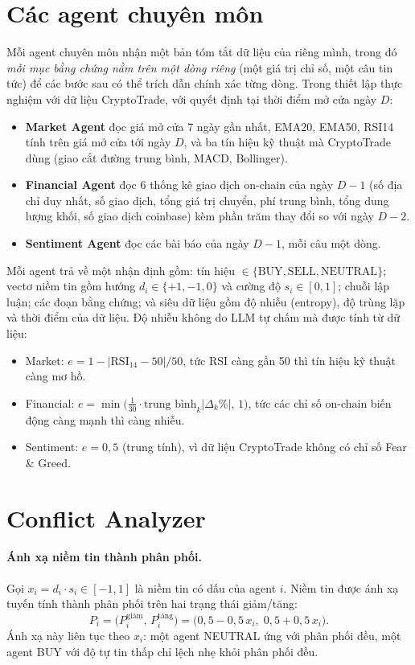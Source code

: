 \section{Các agent chuyên môn}
\label{sec:specialists}
Mỗi agent chuyên môn nhận một bản tóm tắt dữ liệu của riêng mình, trong đó \emph{mỗi mục bằng chứng nằm trên một dòng
riêng} (một giá trị chỉ số, một câu tin tức) để các bước sau có thể trích dẫn chính xác từng dòng. Trong thiết lập
thực nghiệm với dữ liệu CryptoTrade, với quyết định tại thời điểm mở cửa ngày $D$:
\begin{itemize}
  \item \textbf{Market Agent} đọc giá mở cửa 7 ngày gần nhất, EMA20, EMA50, RSI14 tính trên giá mở cửa tới ngày $D$, và
  ba tín hiệu kỹ thuật mà CryptoTrade dùng (giao cắt đường trung bình, MACD, Bollinger).
  \item \textbf{Financial Agent} đọc 6 thống kê giao dịch on-chain của ngày $D-1$ (số địa chỉ duy nhất, số giao dịch,
  tổng giá trị chuyển, phí trung bình, tổng dung lượng khối, số giao dịch coinbase) kèm phần trăm thay đổi so với ngày
  $D-2$.
  \item \textbf{Sentiment Agent} đọc các bài báo của ngày $D-1$, mỗi câu một dòng.
\end{itemize}

Mỗi agent trả về một nhận định gồm: tín hiệu $\in\{\text{BUY},\text{SELL},\text{NEUTRAL}\}$; vectơ niềm tin gồm hướng
$d_i\in\{+1,-1,0\}$ và cường độ $s_i\in[0,1]$; chuỗi lập luận; các đoạn bằng chứng; và siêu dữ liệu gồm độ nhiễu
(entropy), độ trùng lặp và thời điểm của dữ liệu. Độ nhiễu không do LLM tự chấm mà được tính từ dữ liệu:
\begin{itemize}
  \item Market: $e = 1 - |\text{RSI}_{14} - 50|/50$, tức RSI càng gần 50 thì tín hiệu kỹ thuật càng mơ hồ.
  \item Financial: $e = \min\!\big(\tfrac{1}{30}\cdot\text{trung bình}_k|\Delta_k\%|,\,1\big)$, tức các chỉ số on-chain biến
  động càng mạnh thì càng nhiễu.
  \item Sentiment: $e = 0{,}5$ (trung tính), vì dữ liệu CryptoTrade không có chỉ số Fear \& Greed.
\end{itemize}

\section{Conflict Analyzer}
\label{sec:conflict}
\paragraph{Ánh xạ niềm tin thành phân phối.} Gọi $x_i = d_i\cdot s_i\in[-1,1]$ là niềm tin có dấu của agent $i$.
Niềm tin được ánh xạ tuyến tính thành phân phối trên hai trạng thái giảm/tăng:
\begin{equation}
  P_i = \big(P_i^{\text{giảm}},\,P_i^{\text{tăng}}\big) = \big(0{,}5 - 0{,}5\,x_i,\;0{,}5 + 0{,}5\,x_i\big).
\end{equation}
Ánh xạ này liên tục theo $x_i$: một agent NEUTRAL ứng với phân phối đều, một agent BUY với độ tự tin thấp chỉ lệch nhẹ
khỏi phân phối đều.

